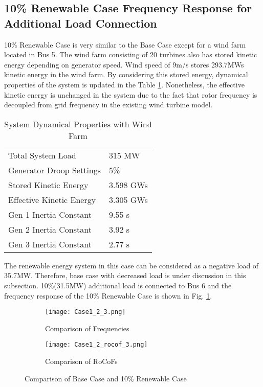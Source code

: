 \subsection{10\% Renewable Case Frequency Response for Additional Load Connection}
10\% Renewable Case is very similar to the Base Case except for a wind farm located in Bus 5. The wind farm consisting of 20 turbines also has stored kinetic energy depending on generator speed. Wind speed of 9m/s stores 293.7MWs kinetic energy in the wind farm. By considering this stored energy, dynamical properties of the system is updated in the Table \ref{systemdynamicaldatamod}. Nonetheless, the effective kinetic energy is unchanged in the system due to the fact that rotor frequency is decoupled from grid frequency in the existing wind turbine model.\par
\begin{table}[h]
	\centering
	\begin{tabular}{ll}
		\hline
		Total System Load                      & 315 MW    \\
		Generator Droop Settings               & 5\%       \\
		Stored Kinetic Energy                  & 3.598 GWs \\
		Effective Kinetic Energy               & 3.305 GWs \\
		Gen 1 Inertia Constant                 & 9.55 s  \\
		Gen 2 Inertia Constant                 & 3.92 s  \\
		Gen 3 Inertia Constant                 & 2.77 s  \\ \hline
	\end{tabular}
	\caption{System Dynamical Properties with Wind Farm}
	\label{systemdynamicaldatamod}
\end{table}
The renewable energy system in this case can be considered as a negative load of 35.7MW. Therefore, base case with decreased load is under discussion in this subsection. 10\%(31.5MW) additional load is connected to Bus 6 and the frequency response of the 10\% Renewable Case is shown in Fig. \ref{Case1_2_freq}. \par
\begin{figure}[h!]
	\centering
		\begin{subfigure}{0.9\textwidth} %
			\centering
		\texttt{[image: Case1\_2\_3.png]}
		\caption{Comparison of Frequencies}		
		\label{Case1_2_freq}
		\end{subfigure}
		\vspace{0.1em} %
	\begin{subfigure}{0.9\textwidth}
\centering	\texttt{[image: Case1\_2\_rocof\_3.png]}
	\caption{Comparison of RoCoFs}
	\label{Case1_2_rocof}	
	\end{subfigure}
	\caption{Comparison of Base Case and 10\% Renewable Case}
\end{figure}
